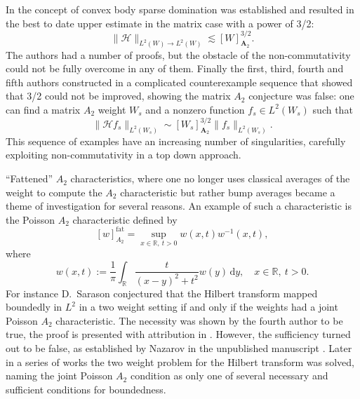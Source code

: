\documentclass{amsart}
\newcommand{\R}{\mathbb{R}}
\theoremstyle{definition}
\theoremstyle{remark}
\begin{document}
In \cite{NaPeTrVo} the concept of convex body sparse domination was established and resulted in the best to date upper estimate in the matrix case with a power of 3/2:
$$\|\mathcal{H}\|_{L^2(W)\to L^2(W)}\lesssim [W]_{\mathbf{A}_2}^{3/2}.$$
The authors had a number of proofs, but the obstacle of the non-commutativity could not be fully overcome in any of them. Finally the first, third, fourth and fifth authors constructed in \cite{DoPeTrVo} a complicated counterexample sequence that showed that 3/2 could not be improved, showing the matrix $A_2$ conjecture was false: one can find a matrix $A_2$ weight $W_s$ and a nonzero function $f_s\in L^2(W_s)$ such that
\begin{equation}
    \label{eq:sharp_matrix_A2}
    \|\mathcal{H}f_s\|_{L^2(W_s)}\sim [W_s]_{\mathbf{A}_2}^{3/2}\|f_s\|_{L^2(W_s)}. 
\end{equation}
This sequence of examples have an increasing number of singularities, carefully exploiting non-commutativity in a top down approach. 

``Fattened'' $A_2$ characteristics, where one no longer uses classical averages of the weight to compute the $A_2$ characteristic but rather bump averages became a theme of investigation for several reasons. An example of such a characteristic is the Poisson $A_2$ characteristic defined by
\begin{equation}
    \label{eq:scalar_Poisson_characteristic}
    [w]_{{A}_2}^{\text{fat}}=\sup_{x\in\R,~t>0}w(x,t)w^{-1}(x,t),
\end{equation}
where 
$$w(x,t) := \frac{1}{\pi}\int_{\R}\frac{t}{(x-y)^2+t^2}w(y)\,\mathrm{d}y,\quad x\in\R,~t>0.$$
For instance D.~Sarason conjectured \cite[Section 7.9]{HaNi} that the Hilbert transform mapped boundedly in $L^2$ in a two weight setting if and only if the weights had a joint Poisson $A_2$ characteristic. The necessity was shown by the fourth author to be true, the proof is presented with attribution in \cite[Section 7.9]{HaNi}. However, the sufficiency turned out to be false, as established by Nazarov in the unpublished manuscript \cite{Na}. Later in a series of works \cite{LaI, LaII, LaIII, Hy} the two weight problem for the Hilbert transform was solved, naming the joint Poisson $A_2$ condition as only one of several necessary and sufficient conditions for boundedness.
\end{document}
